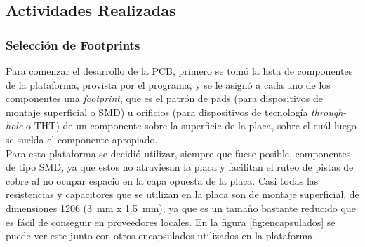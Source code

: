 \subsection{Actividades Realizadas}

\subsubsection{Selección de Footprints}

Para comenzar el desarrollo de la PCB, primero se tomó la lista de componentes de la plataforma, provista por el programa, y se le asignó a cada uno de los componentes una \textit{footprint}, que es el patrón de pads (para dispositivos de montaje superficial o SMD) u orificios (para dispositivos de tecnología \textit{through-hole} o THT) de un componente sobre la superficie de la placa, sobre el cuál luego se suelda el componente apropiado.\\ 

Para esta plataforma se decidió utilizar, siempre que fuese posible, componentes de tipo SMD, ya que estos no atraviesan la placa y facilitan el ruteo de pistas de cobre al no ocupar espacio en la capa opuesta de la placa. Casi todas las resistencias y capacitores que se utilizan en la placa son de montaje superficial, de dimensiones 1206 (\SI[]{3}[]{\milli\metre} x \SI[]{1.5}[]{\milli\metre}), ya que es un tamaño bastante reducido que es fácil de conseguir en proveedores locales. En la figura \ref{fig:encapsulados} se puede ver este junto con otros encapsulados utilizados en la plataforma.\\

